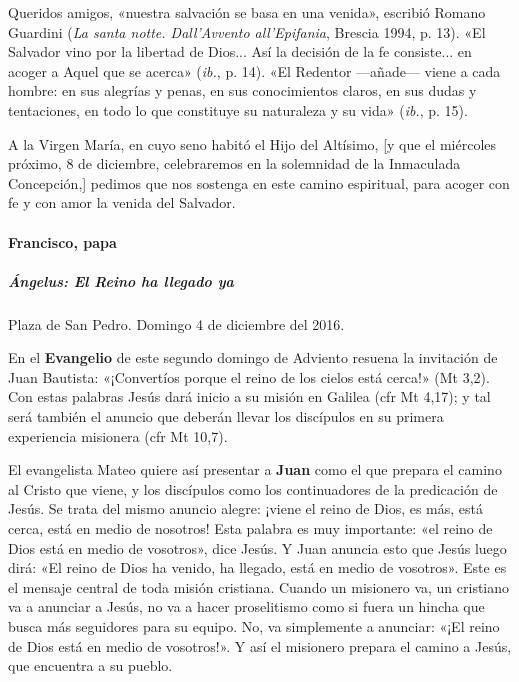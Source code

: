 \documentclass[]{article}
\let\oldparagraph\paragraph
\renewcommand{\paragraph}[1]{\oldparagraph{#1}\mbox{}}
\let\oldsubparagraph\subparagraph
\renewcommand{\subparagraph}[1]{\oldsubparagraph{#1}\mbox{}}
\begin{document}
Queridos amigos, «nuestra salvación se basa en una venida», escribió
Romano Guardini (\emph{La santa notte. Dall'Avvento all'Epifania},
Brescia 1994, p. 13). «El Salvador vino por la libertad de Dios... Así
la decisión de la fe consiste... en acoger a Aquel que se acerca»
(\emph{ib.}, p. 14). «El Redentor ---añade--- viene a cada hombre: en
sus alegrías y penas, en sus conocimientos claros, en sus dudas y
tentaciones, en todo lo que constituye su naturaleza y su vida»
(\emph{ib.}, p. 15).

A la Virgen María, en cuyo seno habitó el Hijo del Altísimo, {[}y que el
miércoles próximo, 8 de diciembre, celebraremos en la solemnidad de la
Inmaculada Concepción,{]} pedimos que nos sostenga en este camino
espiritual, para acoger con fe y con amor la venida del Salvador.

\protect\hypertarget{_Toc448662730}{}{\protect\hypertarget{_Toc448690249}{}{\protect\hypertarget{_Toc448708272}{}{\protect\hypertarget{_Toc448709358}{}{\protect\hypertarget{_Toc449554360}{}{}}}}}

\paragraph{Francisco, papa}\label{francisco-papa-1}

\subparagraph{Ángelus: El Reino ha llegado
ya}\label{uxe1ngelus-el-reino-ha-llegado-ya}

Plaza de San Pedro. Domingo 4 de diciembre del 2016.

En el \textbf{Evangelio} de este segundo domingo de Adviento resuena la
invitación de Juan Bautista: «¡Convertíos porque el reino de los cielos
está cerca!» (Mt 3,2). Con estas palabras Jesús dará inicio a su misión
en Galilea (cfr Mt 4,17); y tal será también el anuncio que deberán
llevar los discípulos en su primera experiencia misionera (cfr Mt 10,7).

El evangelista Mateo quiere así presentar a \textbf{Juan} como el que
prepara el camino al Cristo que viene, y los discípulos como los
continuadores de la predicación de Jesús. Se trata del mismo anuncio
alegre: ¡viene el reino de Dios, es más, está cerca, está en medio de
nosotros! Esta palabra es muy importante: «el reino de Dios está en
medio de vosotros», dice Jesús. Y Juan anuncia esto que Jesús luego
dirá: «El reino de Dios ha venido, ha llegado, está en medio de
vosotros». Este es el mensaje central de toda misión cristiana. Cuando
un misionero va, un cristiano va a anunciar a Jesús, no va a hacer
proselitismo como si fuera un hincha que busca más seguidores para su
equipo. No, va simplemente a anunciar: «¡El reino de Dios está en medio
de vosotros!». Y así el misionero prepara el camino a Jesús, que
encuentra a su pueblo.
\end{document}
